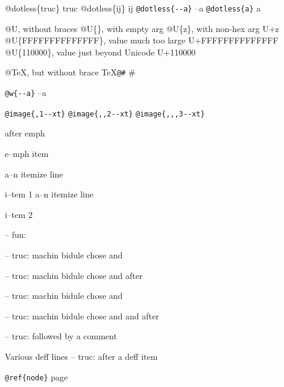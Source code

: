 \documentclass{book}
\begin{document}
@dotless\{truc\} truc
@dotless\{ij\} ij
\texttt{@dotless\{{-}{-}a\}} --a
\texttt{@dotless\{a\}} a

@U, without braces @U\{\}, with empty arg 
@U\{z\}, with non-hex arg U+z
@U\{FFFFFFFFFFFFFF\}, value much too large U+FFFFFFFFFFFFFF
@U\{110000\}, value just beyond Unicode U+110000

@TeX, but without brace \TeX{}\texttt{@\#} \#

\texttt{@w\{{-}{-}a\}} \hbox{--a}

\texttt{@image\{,1{-}{-}xt\}} 
\texttt{@image\{,,2{-}{-}xt\}} 
\texttt{@image\{,,,3{-}{-}xt\}} 


\emph{} after emph 

e--mph item

\textbullet{} a--n itemize line 

i--tem 1
\textbullet{} a--n itemize line 

i--tem 2

\hbox{}-- fun: 


\hbox{}-- truc: machin bidule chose and


\hbox{}-- truc: machin bidule chose and  after


\hbox{}-- truc: machin bidule chose and 


\hbox{}-- truc: machin bidule chose and and after


\hbox{}-- truc: followed by a comment


Various deff lines
\hbox{}-- truc: after a deff item



\texttt{@ref\{node\}} page \pageref{anchor:node}
\end{document}

